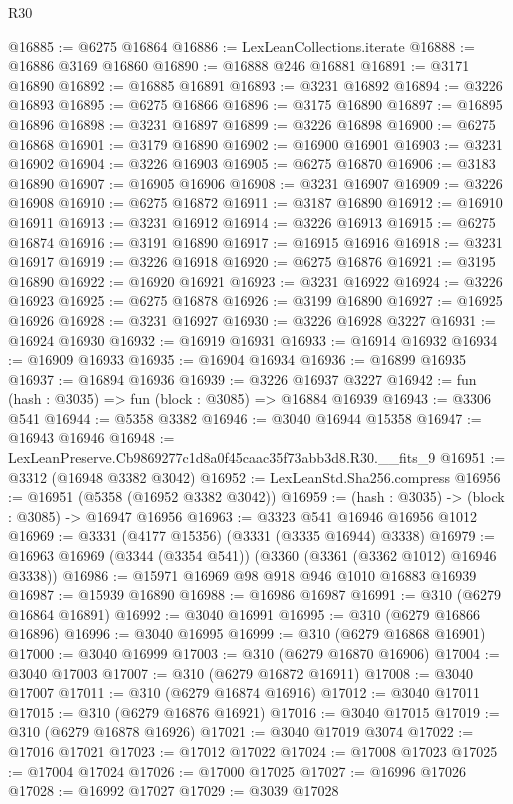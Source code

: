 \begin{lexlean}{R30}
\begin{coremodule}
@16885 := @6275 @16864
@16886 := LexLeanCollections.iterate
@16888 := @16886 @3169 @16860
@16890 := @16888 @246 @16881
@16891 := @3171 @16890
@16892 := @16885 @16891
@16893 := @3231 @16892
@16894 := @3226 @16893
@16895 := @6275 @16866
@16896 := @3175 @16890
@16897 := @16895 @16896
@16898 := @3231 @16897
@16899 := @3226 @16898
@16900 := @6275 @16868
@16901 := @3179 @16890
@16902 := @16900 @16901
@16903 := @3231 @16902
@16904 := @3226 @16903
@16905 := @6275 @16870
@16906 := @3183 @16890
@16907 := @16905 @16906
@16908 := @3231 @16907
@16909 := @3226 @16908
@16910 := @6275 @16872
@16911 := @3187 @16890
@16912 := @16910 @16911
@16913 := @3231 @16912
@16914 := @3226 @16913
@16915 := @6275 @16874
@16916 := @3191 @16890
@16917 := @16915 @16916
@16918 := @3231 @16917
@16919 := @3226 @16918
@16920 := @6275 @16876
@16921 := @3195 @16890
@16922 := @16920 @16921
@16923 := @3231 @16922
@16924 := @3226 @16923
@16925 := @6275 @16878
@16926 := @3199 @16890
@16927 := @16925 @16926
@16928 := @3231 @16927
@16930 := @3226 @16928 @3227
@16931 := @16924 @16930
@16932 := @16919 @16931
@16933 := @16914 @16932
@16934 := @16909 @16933
@16935 := @16904 @16934
@16936 := @16899 @16935
@16937 := @16894 @16936
@16939 := @3226 @16937 @3227
@16942 := fun (hash : @3035) => fun (block : @3085) => @16884 @16939
@16943 := @3306 @541
@16944 := @5358 @3382
@16946 := @3040 @16944 @15358
@16947 := @16943 @16946
@16948 := LexLeanPreserve.Cb9869277c1d8a0f45caac35f73abb3d8.R30.__fits_9
@16951 := @3312 (@16948 @3382 @3042)
@16952 := LexLeanStd.Sha256.compress
@16956 := @16951 (@5358 (@16952 @3382 @3042))
@16959 := (hash : @3035) -> (block : @3085) -> @16947 @16956
@16963 := @3323 @541 @16946 @16956 @1012
@16969 := @3331 (@4177 @15356) (@3331 (@3335 @16944) @3338)
@16979 := @16963 @16969 (@3344 (@3354 @541)) (@3360 (@3361 (@3362 @1012) @16946 @3338))
@16986 := @15971 @16969 @98 @918 @946 @1010 @16883 @16939
@16987 := @15939 @16890
@16988 := @16986 @16987
@16991 := @310 (@6279 @16864 @16891)
@16992 := @3040 @16991
@16995 := @310 (@6279 @16866 @16896)
@16996 := @3040 @16995
@16999 := @310 (@6279 @16868 @16901)
@17000 := @3040 @16999
@17003 := @310 (@6279 @16870 @16906)
@17004 := @3040 @17003
@17007 := @310 (@6279 @16872 @16911)
@17008 := @3040 @17007
@17011 := @310 (@6279 @16874 @16916)
@17012 := @3040 @17011
@17015 := @310 (@6279 @16876 @16921)
@17016 := @3040 @17015
@17019 := @310 (@6279 @16878 @16926)
@17021 := @3040 @17019 @3074
@17022 := @17016 @17021
@17023 := @17012 @17022
@17024 := @17008 @17023
@17025 := @17004 @17024
@17026 := @17000 @17025
@17027 := @16996 @17026
@17028 := @16992 @17027
@17029 := @3039 @17028

\end{coremodule}
\end{lexlean}
